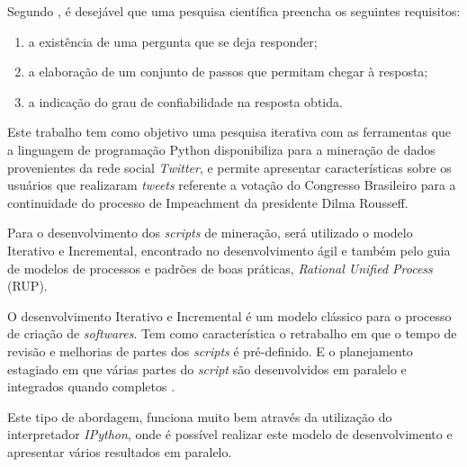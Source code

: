 Segundo , é desejável que uma pesquisa científica preencha os seguintes requisitos:

\begin{enumerate}
	\item a existência de uma pergunta que se deja responder;
	\item a elaboração de um conjunto de passos que permitam chegar à resposta;
	\item a indicação do grau de confiabilidade na resposta obtida.
\end{enumerate}
 
Este trabalho tem como objetivo uma pesquisa iterativa com as ferramentas que a linguagem de programação Python disponibiliza para a mineração de dados provenientes da rede social \textit{Twitter}, e permite apresentar características sobre os usuários que realizaram \textit{tweets} referente a votação do Congresso Brasileiro para a continuidade do processo de Impeachment da presidente Dilma Rousseff.

Para o desenvolvimento dos \textit{scripts} de mineração, será utilizado o modelo Iterativo e Incremental, encontrado no desenvolvimento ágil e também pelo guia de modelos de processos e padrões de boas práticas, \textit{Rational Unified Process} (RUP).

O desenvolvimento Iterativo e Incremental é um modelo clássico para o processo de criação de \textit{softwares}. Tem como característica o retrabalho em que o tempo de revisão e melhorias de partes dos \textit{scripts} é pré-definido. E o planejamento estagiado em que várias partes do \textit{script} são desenvolvidos em paralelo e integrados quando completos \cite{rup}.

Este tipo de abordagem, funciona muito bem através da utilização do interpretador \textit{IPython}, onde é possível realizar este modelo de desenvolvimento e apresentar vários resultados em paralelo.



